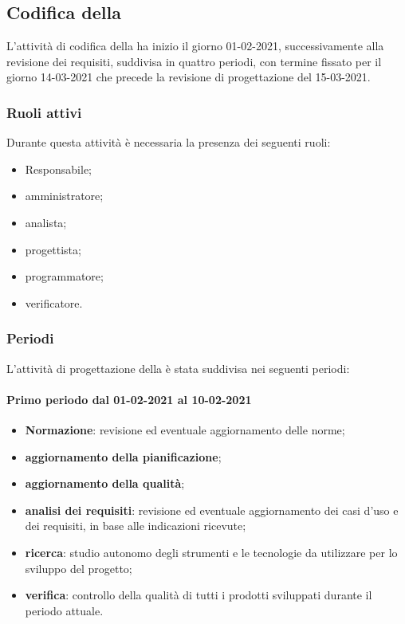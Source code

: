 \newpage
\subsection{Codifica della }
L'attività di codifica della  ha inizio il giorno 01-02-2021, successivamente alla revisione dei requisiti, suddivisa in quattro periodi, con termine fissato per il giorno 14-03-2021 che precede la revisione di progettazione del 15-03-2021.

\subsubsection{Ruoli attivi}
Durante questa attività è necessaria la presenza dei seguenti ruoli:
\begin{itemize}
	\item Responsabile;
	\item amministratore;
	\item analista;
	\item progettista;
	\item programmatore;
	\item verificatore.
\end{itemize}

\subsubsection{Periodi}
L'attività di progettazione della  è stata suddivisa nei seguenti periodi:

\paragraph{Primo periodo dal 01-02-2021 al 10-02-2021}
\begin{itemize}
	\item \textbf{Normazione}: revisione ed eventuale aggiornamento delle norme;
	\item \textbf{aggiornamento della pianificazione};
	\item \textbf{aggiornamento della qualità};
	\item \textbf{analisi dei requisiti}: revisione ed eventuale aggiornamento dei casi d’uso e dei requisiti, in base alle indicazioni ricevute;
	\item \textbf{ricerca}: studio autonomo degli strumenti e le tecnologie da utilizzare per lo sviluppo del
	progetto;
	\item \textbf{verifica}: controllo della qualità di tutti i prodotti sviluppati durante il periodo attuale.
\end{itemize}


